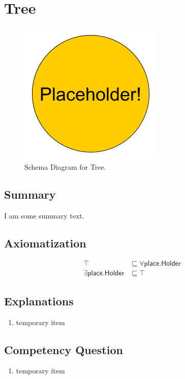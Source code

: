 \section{Tree}
\label{sec:Tree}
\begin{figure}[h!]
\begin{center}
\includegraphics[width=.4\textwidth]{figures/placeholder}
\end{center}
\caption{Schema Diagram for Tree.}
\label{fig:Tree}
\end{figure}
\subsection{Summary}
\label{sum:Tree}
I am some summary text.

\subsection{Axiomatization}
\label{axs:Tree}
\begin{align}
\top &\sqsubseteq \forall\textsf{place.Holder} \\ 
\exists\textsf{place.Holder} &\sqsubseteq \top 
\end{align}

\subsection{Explanations}
\label{exp:Tree}
\begin{enumerate}
\item temporary item
\end{enumerate}

\subsection{Competency Question}
\label{cqs:Tree}
\begin{enumerate}[CQ1.]
\item temporary item
\end{enumerate}

\newpage
